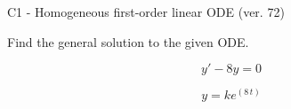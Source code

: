 \begin{exercise}
  \begin{exerciseTitle}C1 - Homogeneous first-order linear ODE (ver. 72)\end{exerciseTitle}
  \begin{exerciseStatement}
    
Find the general solution to the given ODE.

    
\[y'-8y=0\]

  \end{exerciseStatement}
  \begin{exerciseAnswer}
    
\[y= k e^{\left(8 \, t\right)}\]

  \end{exerciseAnswer}
\end{exercise}